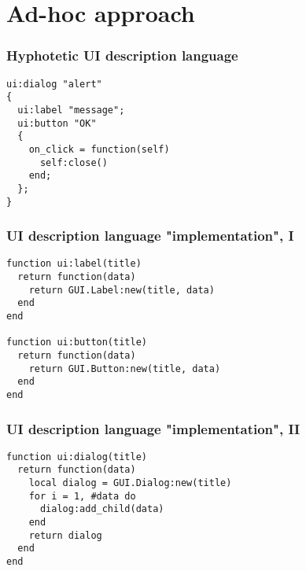 \documentclass[handout]{beamer}
\begin{document}

\section{Ad-hoc approach}


\begin{frame}[fragile]

\frametitle{Hyphotetic UI description language}

\begin{verbatim}
ui:dialog "alert"
{
  ui:label "message";
  ui:button "OK"
  {
    on_click = function(self)
      self:close()
    end;
  };
}
\end{verbatim}

\end{frame}


\begin{frame}[fragile]

\frametitle{UI description language "implementation", I}

\begin{verbatim}
function ui:label(title)
  return function(data)
    return GUI.Label:new(title, data)
  end
end

function ui:button(title)
  return function(data)
    return GUI.Button:new(title, data)
  end
end
\end{verbatim}

\end{frame}


\begin{frame}[fragile]

\frametitle{UI description language "implementation", II}

\begin{verbatim}
function ui:dialog(title)
  return function(data)
    local dialog = GUI.Dialog:new(title)
    for i = 1, #data do
      dialog:add_child(data)
    end
    return dialog
  end
end
\end{verbatim}

\end{frame}

\end{document}
